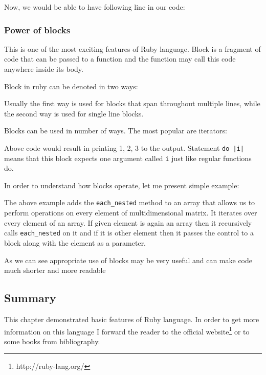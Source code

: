       
      
      Now, we would be able to have following line in our code:
      
      
      
      \subsubsection{Power of blocks}
      This is one of the most exciting features of Ruby language. Block is a fragment of code that can be passed to a function and the function may call this code anywhere inside its body. 
      
      Block in ruby can be denoted in two ways:
      
      
      
      Usually the first way is used for blocks that span throughout multiple lines, while the second way is used for single line blocks. 
      
      Blocks can be used in number of ways. The most popular are iterators:
      
      
      
      Above code would result in printing 1, 2, 3 to the output. Statement \texttt{do |i|} means that this block expects one argument called \texttt{i} just like regular functions do.
      
      In order to understand how blocks operate, let me present simple example:
      
      
      
      The above example adds the \texttt{each\_nested} method to an array that allows us to perform operations on every element of multidimensional matrix. It iterates over every element of an array. If given element is again an array then it recursively calls \texttt{each\_nested} on it and if it is other element then it passes the control to a block along with the element as a parameter.
      
      As we can see appropriate use of blocks may be very useful and can make code much shorter and more readable
      
    \subsection{Summary}
    This chapter demonstrated basic features of Ruby language. In order to get more information on this language I forward the reader to the official website\footnote{http://ruby-lang.org/} or to some books from bibliography\cite{ruby01}.
    
